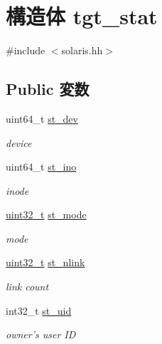 \hypertarget{structSolaris_1_1tgt__stat}{
\section{構造体 tgt\_\-stat}
\label{structSolaris_1_1tgt__stat}
}


{\ttfamily \#include $<$solaris.hh$>$}\subsection*{Public 変数}
\begin{DoxyCompactItemize}
\item 
uint64\_\-t \hyperlink{structSolaris_1_1tgt__stat_a0146849d3da5c91d9776888b14b82dcc}{st\_\-dev}
\begin{DoxyCompactList}\small\item\em device \item\end{DoxyCompactList}\item 
uint64\_\-t \hyperlink{structSolaris_1_1tgt__stat_abb54f0e7d91659ba9f4ab77a5392c08a}{st\_\-ino}
\begin{DoxyCompactList}\small\item\em inode \item\end{DoxyCompactList}\item 
\hyperlink{Type_8hh_a435d1572bf3f880d55459d9805097f62}{uint32\_\-t} \hyperlink{structSolaris_1_1tgt__stat_a75f55d064ed3b380b0315de36e178885}{st\_\-mode}
\begin{DoxyCompactList}\small\item\em mode \item\end{DoxyCompactList}\item 
\hyperlink{Type_8hh_a435d1572bf3f880d55459d9805097f62}{uint32\_\-t} \hyperlink{structSolaris_1_1tgt__stat_ab77c257c135fa586e930ef0bf0977c08}{st\_\-nlink}
\begin{DoxyCompactList}\small\item\em link count \item\end{DoxyCompactList}\item 
int32\_\-t \hyperlink{structSolaris_1_1tgt__stat_a3bb3835f9991cdc69a5cea7ca39fbaaa}{st\_\-uid}
\begin{DoxyCompactList}\small\item\em owner's user ID \item\end{DoxyCompactList}\item 

\end{DoxyCompactItemize}
